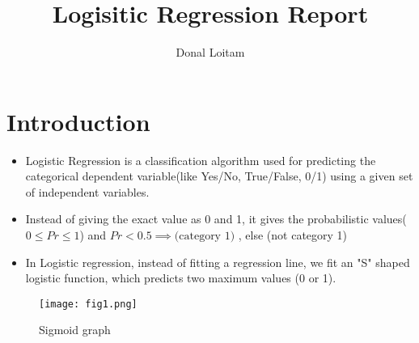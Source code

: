 \documentclass[a4paper, 11pt]{article}
\title{Logisitic Regression Report}
\author{Donal Loitam}
\begin{document}
\maketitle
\tableofcontents

\section{Introduction}
\begin{itemize}
    \item Logistic Regression is a classification algorithm used for predicting the categorical 
    dependent variable(like Yes/No, True/False, 0/1) using a given set of independent variables.
    \item Instead of giving the exact value as 0 and 1, it gives the probabilistic values($0\le Pr \le 1$) and
    $Pr < 0.5 \implies \text{(category 1)}$ , else (not category 1) 
    \item In Logistic regression, instead of fitting a regression line, we fit an "S" shaped logistic function, which predicts two maximum values (0 or 1).
\end{itemize}
\begin{figure}
    \texttt{[image: fig1.png]}
    \caption{Sigmoid graph}
    \label{fig:fig1}
  \end{figure}

\pagebreak
\end{document}
